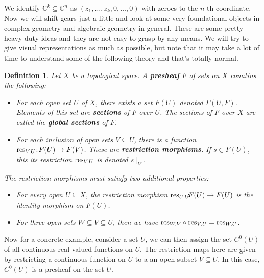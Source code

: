 \documentclass[12pt, letterpaper]{article}
\newtheorem{definition}{Definition}[section]
\newcommand{\C}{\mathbb{C}}
\newcommand{\ten}[1]{\textnormal{\textbf{#1}}}
\begin{document}
We identify $\C^k \subseteq \C^n$ as $(z_1, \hdots, z_k, 0, \hdots, 0)$ with zeroes
to the $n$-th coordinate.\\

Now we will shift gears just a little and look at some very foundational objects in 
complex geometry and algebraic geometry in general. These are some pretty heavy duty
ideas and they are not easy to grasp by any means. We will try to give visual representations
as much as possible, but note that it may take a lot of time to understand some of
the following theory and that's totally normal.\\

\begin{definition}
    Let $X$ be a topological space. A \ten{presheaf} $F$ of sets on $X$ conatins
    the following:
    \begin{itemize}
        \item For each open set $U$ of $X$, there exists a set $F(U)$ denoted
        $\Gamma(U,F)$. Elements of this set are \ten{sections} of $F$ over $U$.
        The sections of $F$ over $X$ are called the \ten{global sections} of $F$.
        \item For each inclusion of open sets $V \subseteq U$, there is a function
        $\textnormal{res}_{V,U} \hspace{-2pt}: \hspace{-2pt}F(U) \to F(V)$. These are \ten{restriction morphisms}.
        If $s \in F(U)$, this its restriction $\textnormal{res}_{V,U}$ is denoted $s \mid_V$.
    \end{itemize}
    The restriction morphisms must satisfy two additional properties:
    \begin{itemize}
        \item For every open $U \subseteq X$, the restriction morphism
        $\textnormal{res}_{U,U} \hspace{-5pt}:\hspace{-5pt} F(U) \to F(U)$ is the identity morphism on $F(U)$.
        \item For three open sets $W \subseteq V \subseteq U$, then we have
        $\textnormal{res}_{W,V} \circ \textnormal{res}_{V,U} = \textnormal{res}_{W,U}$.
    \end{itemize}
\end{definition}

Now for a concrete example, consider a set $U$, we can then assign the set $C^0(U)$
of all continuous real-valued functions on $U$. The restriction maps here are given
by restricting a continuous function on $U$ to a an open subset $V \subseteq U$.
In this case, $C^0(U)$ is a presheaf on the set $U$.\\
\end{document}
